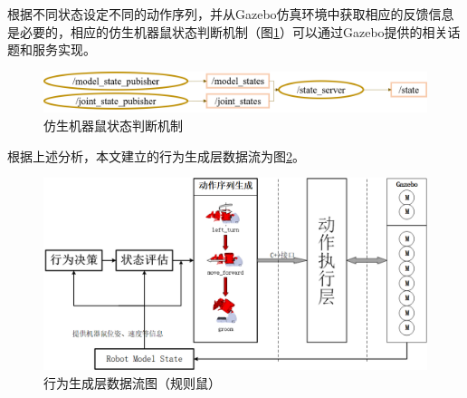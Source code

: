 
根据不同状态设定不同的动作序列，并从Gazebo仿真环境中获取相应的反馈信息是必要的，相应的仿生机器鼠状态判断机制（图\ref{figure_statecheck}）可以通过Gazebo提供的相关话题和服务实现。
\begin{figure}[htb]
  \vspace{3pt}
  \centering
  \includegraphics[width=0.95\linewidth]{images/ch03/statecheck.png}
  \caption{仿生机器鼠状态判断机制}\label{figure_statecheck}
\end{figure}

根据上述分析，本文建立的行为生成层数据流为图\ref{figure_behavgene}。
\begin{figure}[htb]
  \centering
  \includegraphics[height=0.25\linewidth]{images/ch03/behavgene.png}
  \caption{行为生成层数据流图（规则鼠）}\label{figure_behavgene}
\end{figure}
